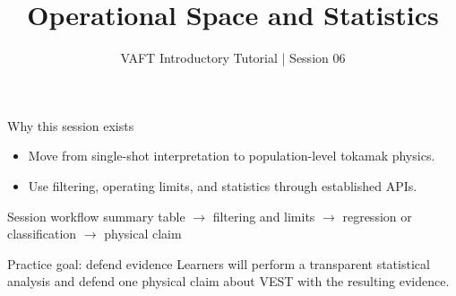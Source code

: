 \documentclass[aspectratio=169]{beamer}
\title{Operational Space and Statistics}
\subtitle{VAFT Introductory Tutorial | Session 06}
\author{}
\date{}
\begin{document}
\begin{frame}
  \titlepage
\end{frame}

\begin{frame}{Why this session exists}
  \begin{itemize}
    \item Move from single-shot interpretation to population-level tokamak physics.
    \item Use filtering, operating limits, and statistics through established APIs.
  \end{itemize}
\end{frame}

\begin{frame}{Session workflow}
  \centering
  summary table \(\rightarrow\) filtering and limits \(\rightarrow\)
  regression or classification \(\rightarrow\) physical claim
\end{frame}

\begin{frame}{Practice goal: defend evidence}
  Learners will perform a transparent statistical analysis and defend one
  physical claim about VEST with the resulting evidence.
\end{frame}
\end{document}
